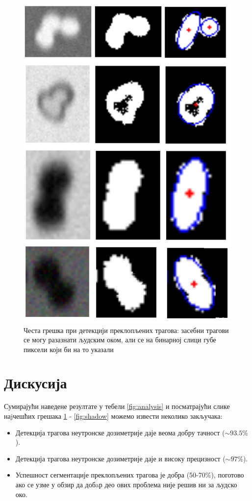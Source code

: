 \documentclass[11pt,a4paper,serbian,oneside]{book}
\begin{document}
\begin{figure}[H]
\begin{center}
\includegraphics[width=150mm]{images/error01.png}
\end{center}
\caption{Честа грешка при детекцији преклопљених трагова: засебни трагови се могу разазнати људским оком, али се на бинарној слици губе пиксели који би на то указали}
\label{fig:error_overlapped}
\end{figure}

\section{Дискусија}

Сумирајући наведене резултате у тебели \ref{fig:analysis} и посматрајући слике наjчешћих грешака  \ref{fig:error_overlapped} - \ref{fig:shadow} можемо извести неколико закључака:
\begin{itemize}
  \item Детекција трагова неутронске дозиметрије даје веома добру тачност ($\sim 93.5\%$).
  \item Детекција трагова неутронске дозиметрије даје и високу прецизност ($\sim97\%$).
  \item Успешност сегментације преклопљених трагова је добра (50-70\%), поготово ако се узме у обзир да добaр део ових проблема није решив ни за људско око.
\end{itemize}
\end{document}
